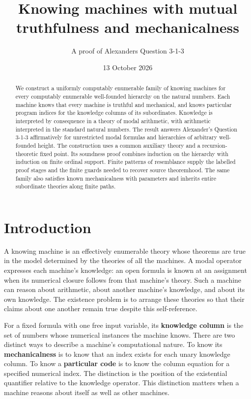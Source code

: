 \documentclass[
  11pt,
  letterpaper,
]{article}
\title{Knowing machines with mutual truthfulness and mechanicalness}
\subtitle{A proof of Alexander\textquotesingle s Question 3-1-3}
\author{}
\date{13 October 2026}
\begin{document}
\maketitle
\begin{abstract}
We construct a uniformly computably enumerable family of knowing
machines for every computably enumerable well-founded hierarchy on the
natural numbers. Each machine knows that every machine is truthful and
mechanical, and knows particular program indices for the knowledge
columns of its subordinates. Knowledge is interpreted by consequence in
a theory of modal arithmetic, with arithmetic interpreted in the
standard natural numbers. The result answers Alexander's Question 3-1-3
affirmatively for unrestricted modal formulas and hierarchies of
arbitrary well-founded height. The construction uses a common auxiliary
theory and a recursion-theoretic fixed point. Its soundness proof
combines induction on the hierarchy with induction on finite ordinal
support. Finite patterns of resemblance supply the labelled proof stages
and the finite guards needed to recover source theoremhood. The same
family also satisfies known mechanicalness with parameters and inherits
entire subordinate theories along finite paths.
\end{abstract}

\section{Introduction}\label{introduction}

A knowing machine is an effectively enumerable theory whose theorems are
true in the model determined by the theories of all the machines. A
modal operator expresses each machine's knowledge: an open formula is
known at an assignment when its numerical closure follows from that
machine's theory. Such a machine can reason about arithmetic, about
another machine's knowledge, and about its own knowledge. The existence
problem is to arrange these theories so that their claims about one
another remain true despite this self-reference.

For a fixed formula with one free input variable, its \textbf{knowledge
column} is the set of numbers whose numerical instances the machine
knows. There are two distinct ways to describe a machine's computational
nature. To know its \textbf{mechanicalness} is to know that an index
exists for each unary knowledge column. To know a \textbf{particular
code} is to know the column equation for a specified numerical index.
The distinction is the position of the existential quantifier relative
to the knowledge operator. This distinction matters when a machine
reasons about itself as well as other machines.
\end{document}
